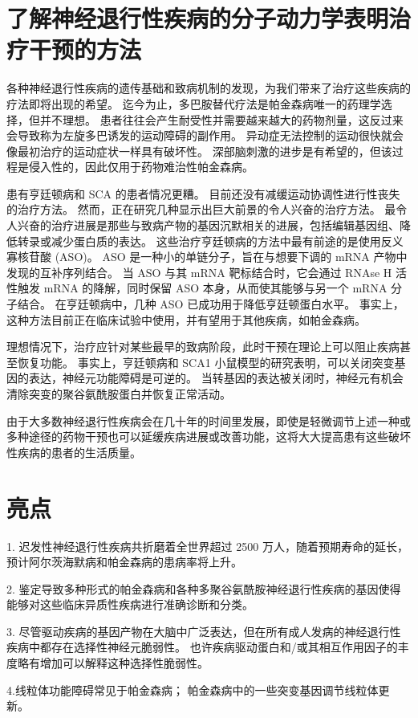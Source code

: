 \section{了解神经退行性疾病的分子动力学表明治疗干预的方法}

各种神经退行性疾病的遗传基础和致病机制的发现，为我们带来了治疗这些疾病的疗法即将出现的希望。 迄今为止，多巴胺替代疗法是帕金森病唯一的药理学选择，但并不理想。 患者往往会产生耐受性并需要越来越大的药物剂量，这反过来会导致称为左旋多巴诱发的运动障碍的副作用。 异动症无法控制的运动很快就会像最初治疗的运动症状一样具有破坏性。 深部脑刺激的进步是有希望的，但该过程是侵入性的，因此仅用于药物难治性帕金森病。

患有亨廷顿病和 SCA 的患者情况更糟。 目前还没有减缓运动协调性进行性丧失的治疗方法。 然而，正在研究几种显示出巨大前景的令人兴奋的治疗方法。 最令人兴奋的治疗进展是那些与致病产物的基因沉默相关的进展，包括编辑基因组、降低转录或减少蛋白质的表达。 这些治疗亨廷顿病的方法中最有前途的是使用反义寡核苷酸 (ASO)。 ASO 是一种小的单链分子，旨在与想要下调的 mRNA 产物中发现的互补序列结合。 当 ASO 与其 mRNA 靶标结合时，它会通过 RNAse H 活性触发 mRNA 的降解，同时保留 ASO 本身，从而使其能够与另一个 mRNA 分子结合。 在亨廷顿病中，几种 ASO 已成功用于降低亨廷顿蛋白水平。 事实上，这种方法目前正在临床试验中使用，并有望用于其他疾病，如帕金森病。

理想情况下，治疗应针对某些最早的致病阶段，此时干预在理论上可以阻止疾病甚至恢复功能。 事实上，亨廷顿病和 SCA1 小鼠模型的研究表明，可以关闭突变基因的表达，神经元功能障碍是可逆的。 当转基因的表达被关闭时，神经元有机会清除突变的聚谷氨酰胺蛋白并恢复正常活动。

由于大多数神经退行性疾病会在几十年的时间里发展，即使是轻微调节上述一种或多种途径的药物干预也可以延缓疾病进展或改善功能，这将大大提高患有这些破坏性疾病的患者的生活质量。

\section{亮点}
1. 迟发性神经退行性疾病共折磨着全世界超过 2500 万人，随着预期寿命的延长，预计阿尔茨海默病和帕金森病的患病率将上升。 

2. 鉴定导致多种形式的帕金森病和各种多聚谷氨酰胺神经退行性疾病的基因使得能够对这些临床异质性疾病进行准确诊断和分类。 

3. 尽管驱动疾病的基因产物在大脑中广泛表达，但在所有成人发病的神经退行性疾病中都存在选择性神经元脆弱性。 也许疾病驱动蛋白和/或其相互作用因子的丰度略有增加可以解释这种选择性脆弱性。 

4.线粒体功能障碍常见于帕金森病； 帕金森病中的一些突变基因调节线粒体更新。 

